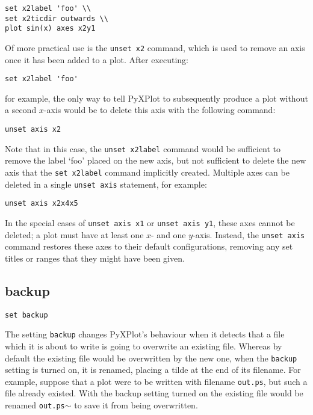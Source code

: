 \begin{verbatim}
set x2label 'foo' \\
set x2ticdir outwards \\
plot sin(x) axes x2y1
\end{verbatim}

Of more practical use is the {\tt unset x2} command, which is used to remove an
axis once it has been added to a plot. After executing:

\begin{verbatim}
set x2label 'foo'
\end{verbatim}

\noindent for example, the only way to tell PyXPlot to subsequently produce a plot
without a second $x$-axis would be to delete this axis with the following
command:

\begin{verbatim}
unset axis x2
\end{verbatim}

Note that in this case, the {\tt unset x2label} command would be sufficient to
remove the label `foo' placed on the new axis, but not sufficient to delete the
new axis that the {\tt set x2label} command implicitly created. Multiple axes
can be deleted in a single {\tt unset axis} statement, for example:

\begin{verbatim}
unset axis x2x4x5
\end{verbatim}

In the special cases of {\tt unset axis x1} or {\tt unset axis y1}, these axes
cannot be deleted; a plot must have at least one $x$- and one $y$-axis. Instead,
the {\tt unset axis} command restores these axes to their default
configurations, removing any set titles or ranges that they might have been
given.

\subsection{backup}

\begin{verbatim}
set backup
\end{verbatim}

The setting {\tt backup} changes PyXPlot's behaviour when it detects that a file
which it is about to write is going to overwrite an existing file. Whereas by
default the existing file would be overwritten by the new one, when the
{\tt backup} setting is turned on, it is renamed, placing a tilde at the end of
its filename. For example, suppose that a plot were to be written with filename
{\tt out.ps}, but such a file already existed.  With the backup setting turned on
the existing file would be renamed {\tt out.ps$\sim$} to save it from being overwritten.

